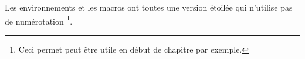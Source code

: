 Les environnements et les macros ont toutes une version étoilée qui n'utilise pas de numérotation
\footnote{
	Ceci permet peut être utile en début de chapitre par exemple. 
}.
